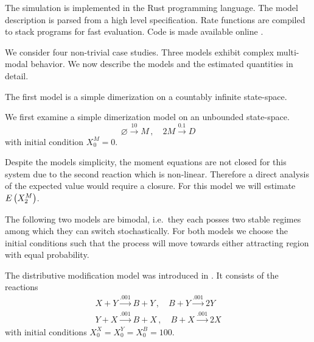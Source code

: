 The simulation is implemented in the Rust programming
language.
The model description is parsed from a high level specification.
Rate functions are compiled to stack programs for fast evaluation.
Code is made available online \parencite{cme-simulation-github}.

We consider four non-trivial case studies. Three models exhibit
complex multi-modal behavior.
We now describe the models and the estimated quantities in detail.

The first model is a simple
dimerization on a countably infinite state-space.
\begin{model}[Dimerization]\label{model:dim2}
  We first examine a simple dimerization model on an unbounded state-space.
  \[\varnothing\xrightarrow{10}M\,,\quad 2M\xrightarrow{0.1}D\]
  with initial condition $X_0^M=0$.
\end{model}
Despite the models simplicity, the moment equations are not closed
for this system
due to the second reaction which is non-linear.
Therefore a direct analysis of the expected value would require a closure.
For this model we will estimate ${E}\left(X^M_2\right)$.

The following two models are bimodal, i.e.\ they each posses two stable regimes
among which they can switch stochastically.
For both models we choose the initial conditions such that the process
will move towards either attracting region with equal probability.
\begin{model}\label{model:dm}
  The distributive modification model was introduced in
  \parencite{cardelli2012cell}.
  It consists of the reactions
  \begin{gather*}
    X + Y \xrightarrow{\num{.001}} B + Y\,,\quad
    B + Y \xrightarrow{\num{.001}} 2 Y\\
    Y + X \xrightarrow{\num{.001}} B + X\,,\quad
    B + X \xrightarrow{\num{.001}} 2 X
  \end{gather*}
  with initial conditions $X^X_0=X^Y_0=X^B_0=100$.
\end{model}


